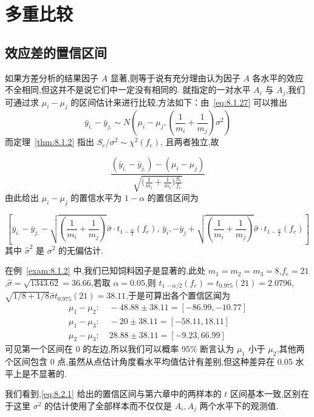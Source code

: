 \section{多重比较}\label{sec:8.2}
\subsection{效应差的置信区间} \label{ssec:8.2.1}
如果方差分析的结果因子 $A$ 显著,则等于说有充分理由认为因子 $A$ 各水平的效应不全相同,但这并不是说它们中一定没有相同的. 就指定的一对水平 $A_i$ 与 $A_j$,我们可通过求 $\mu_i - \mu_j$ 的区间估计来进行比较,方法如下：由~\eqref{eq:8.1.27} 可以推出
\begin{equation*}
  \bar{y}_{i.} - \bar{y}_{j.} \sim N \left(\mu_{i}-\mu_{j},\left(\frac{1}{m_{i}}+\frac{1}{m_{j}}\right) \sigma^{2}\right)
\end{equation*}
而定理~\ref{thm:8.1.2} 指出 $S_e/\sigma^2 \sim \chi^2(f_e)$, 且两者独立,故

\begin{equation*}
  \frac{(\bar{y}_{i.} - \bar{y}_{j.}) - (\mu_i - \mu_j) }{\sqrt{\big(\frac{1}{m_i} + \frac{1}{m_i}\big) \frac{S_e}{f_e}}}
\end{equation*}
由此给出 $\mu_i -\mu_j$ 的置信水平为 $1-\alpha$ 的置信区间为

\begin{equation}\label{eq:8.2.1}
  \left[\bar{y}_{i.}-\bar{y}_{j.}-\sqrt{\left(\frac{1}{m_{i}}+\frac{1}{m_{j}}\right)} \hat{\sigma} \cdot t_{1-\frac{\alpha}{2}}\left(f_{e}\right),\,\bar{y}_{i},-\bar{y}_{j}+\sqrt{\left(\frac{1}{m_{i}}+\frac{1}{m_{j}}\right)} \hat{\sigma} \cdot t_{1-\frac{\alpha}{2}}\left(f_{e}\right)\right]
\end{equation}
其中 $\hat{\sigma}^2$ 是 $\sigma^2$ 的无偏估计.

\begin{example}\label{exam:8.2.1}
在例~\ref{exam:8.1.2} 中,我们已知饲料因子是显著的,此处 $m_1=m_2=
m_3 = 8$,$f_e = 21$,$\hat{\sigma}=\sqrt{1343.62} = 36.66$,若取 $\alpha=0.05$,则 $t_{1-\alpha/2}(f_e)=
t_{0.975}(21) = 2.0796$, $\sqrt{1/8+1/8} \hat{\sigma} t_{0.975}(21) = 38.11$,于是可算出各个置信区闻为
\begin{align*} 
\mu_{1}-\mu_{2} : &\; -48.88 \pm 38.11=[-86.99,-10.77] \\ 
\mu_{1}-\mu_{3} : &\; -20 \pm 38.11=[-58.11,18.11] \\ 
\mu_{2}-\mu_{3} : &\; 28.88 \pm 38.11=[-9.23,66.99] 
\end{align*}
可见第一个区间在 0 的左边,所以我们可以概率 95\% 断言认为 $\mu_1$ 小于 $\mu_2$,其他两个区间包含 0 点,虽然从点估计角度看水平均值估计有差别,但这种差异在 0.05 水平上是不显著的.

我们看到,\eqref{eq:8.2.1} 给出的置信区间与第六章中的两样本的 $t$ 区间基本一致,区别在于这里 $\sigma^2$ 的估计使用了全部样本而不仅仅是 $A_i, A_j$ 两个水平下的观测值.
\end{example}

